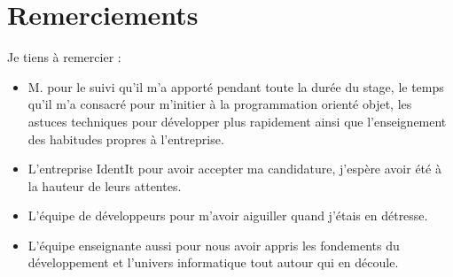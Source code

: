 \chapter*{Remerciements} %
\label{cha:Remerciements}

Je tiens à remercier :
\begin{itemize}
    \item M. pour le suivi qu'il m'a apporté pendant toute la
durée du stage, le temps qu'il m'a consacré pour m'initier à la programmation
orienté objet, les astuces techniques pour développer plus rapidement ainsi que
l'enseignement des habitudes propres à l'entreprise.
    \item L'entreprise IdentIt pour avoir accepter ma candidature, j'espère
avoir été à la hauteur de leurs attentes.
    \item L'équipe de développeurs pour m'avoir aiguiller quand j'étais en
détresse.
    \item L'équipe enseignante aussi pour nous avoir appris les fondements du
développement et l'univers informatique tout autour qui en découle.
\end{itemize}


